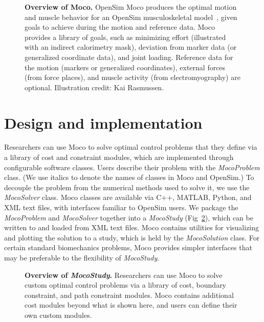\documentclass[10pt,letterpaper]{article}
\begin{document}
\begin{figure}[!h]
    \centering
    \caption{{\bf Overview of Moco.}
        OpenSim Moco produces the optimal motion and muscle behavior for an OpenSim musculoskeletal model~\cite{Seth:2018gg}, given goals to achieve during the motion and reference data. Moco provides a library of goals, such as minimizing effort (illustrated with an indirect calorimetry mask), deviation from marker data (or generalized coordinate data), and joint loading. Reference data for the motion (markers or generalized coordinates), external forces (from force places), and muscle activity (from electromyography) are optional. Illustration credit: Kai Rasmussen.}
    \label{overviewmoco}
\end{figure}

\section*{Design and implementation}

Researchers can use Moco to solve optimal control problems that they define via a library of cost and constraint modules, which are implemented through configurable software classes. Users describe their problem with the \textit{MocoProblem} class. (We use italics to denote the names of classes in Moco and OpenSim.) To decouple the problem from the numerical methods used to solve it, we use the \textit{MocoSolver} class. Moco classes are available via C++, MATLAB, Python, and XML text files, with interfaces familiar to OpenSim users. We package the \textit{MocoProblem} and \textit{MocoSolver} together into a \textit{MocoStudy} (Fig~\ref{mocodiagram}), which can be written to and loaded from XML text files. Moco contains utilities for visualizing and plotting the solution to a study, which is held by the \textit{MocoSolution} class. For certain standard biomechanics problems, Moco provides simpler interfaces that may be preferable to the flexibility of \textit{MocoStudy}.

\begin{figure}[!h]
\centering
    \caption{{\bf Overview of \textit{MocoStudy}.}
        Researchers can use Moco to solve custom optimal control problems via a library of cost, boundary constraint, and path constraint modules. Moco contains additional cost modules beyond what is shown here, and users can define their own custom modules.}
    \label{mocodiagram}
\end{figure}
\end{document}

